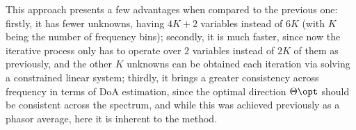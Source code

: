 This approach presents a few advantages when compared to the previous one: firstly, it has fewer unknowns, having $4K + 2$ variables instead of $6K$ (with $K$ being the number of frequency bins); secondly, it is much faster, since now the iterative process only has to operate over $2$ variables instead of $2K$ of them as previously, and the other $K$ unknowns can be obtained each iteration via solving a constrained linear system; thirdly, it brings a greater consistency across frequency in terms of DoA estimation, since the optimal direction $\Theta\opt$ should be consistent across the spectrum, and while this was achieved previously as a phasor average, here it is inherent to the method.